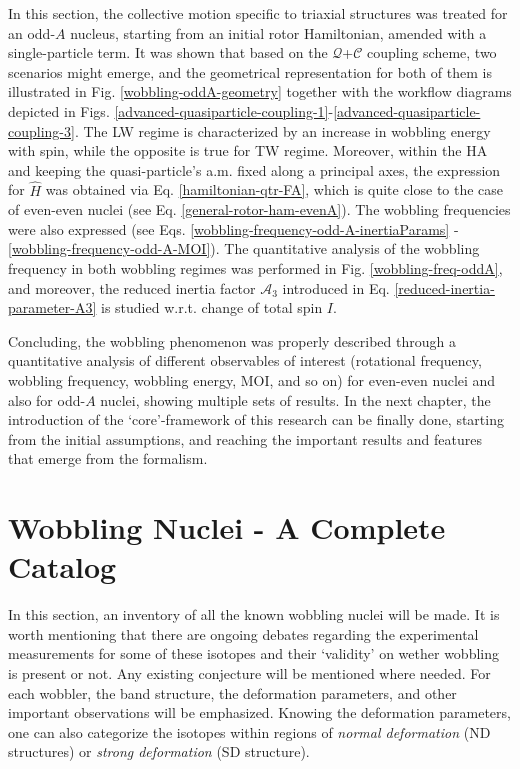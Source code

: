 In this section, the collective motion specific to triaxial structures was treated for an odd-$A$ nucleus, starting from an initial rotor Hamiltonian, amended with a single-particle term. It was shown that based on the $\mathcal{Q}$+$\mathscr{C}$ coupling scheme, two scenarios might emerge, and the geometrical representation for both of them is illustrated in Fig. \ref{wobbling-oddA-geometry} together with the workflow diagrams depicted in Figs. \ref{advanced-quasiparticle-coupling-1}-\ref{advanced-quasiparticle-coupling-3}. The LW regime is characterized by an increase in wobbling energy with spin, while the opposite is true for TW regime. Moreover, within the HA and keeping the quasi-particle's a.m. fixed along a principal axes, the expression for $\hat{H}$ was obtained via Eq. \ref{hamiltonian-qtr-FA}, which is quite close to the case of even-even nuclei (see Eq. \ref{general-rotor-ham-evenA}). The wobbling frequencies were also expressed (see Eqs. \ref{wobbling-frequency-odd-A-inertiaParams} - \ref{wobbling-frequency-odd-A-MOI}). The quantitative analysis of the wobbling frequency in both wobbling regimes was performed in Fig. \ref{wobbling-freq-oddA}, and moreover, the reduced inertia factor $\mathscr{A}_3$ introduced in Eq. \ref{reduced-inertia-parameter-A3} is studied w.r.t. change of total spin $I$.

Concluding, the wobbling phenomenon was properly described through a quantitative analysis of different observables of interest (rotational frequency, wobbling frequency, wobbling energy, MOI, and so on) for even-even nuclei and also for odd-$A$ nuclei, showing multiple sets of results. In the next chapter, the introduction of the `core'-framework of this research can be finally done, starting from the initial assumptions, and reaching the important results and features that emerge from the formalism.

\section{Wobbling Nuclei - A Complete Catalog}

In this section, an inventory of all the known wobbling nuclei will be made. It is worth mentioning that there are ongoing debates regarding the experimental measurements for some of these isotopes and their `validity' on wether wobbling is present or not. Any existing conjecture will be mentioned where needed. For each wobbler, the band structure, the deformation parameters, and other important observations will be emphasized. Knowing the deformation parameters, one can also categorize the isotopes within regions of \emph{normal deformation} (ND structures) or \emph{strong deformation} (SD structure).

